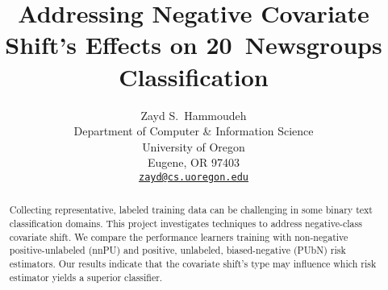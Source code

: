 \documentclass{article}
\title{Addressing Negative Covariate Shift's Effects on 20~Newsgroups Classification}
\author{%
  Zayd S.\ Hammoudeh \\
  Department of Computer \& Information Science \\
  University of Oregon \\
  Eugene, OR 97403 \\
  \texttt{\href{mailto:zayd@cs.uoregon.edu}{zayd@cs.uoregon.edu}}
}
\begin{document}
\maketitle

\begin{abstract}
  Collecting representative, labeled training data can be challenging in some binary text classification domains. This project investigates techniques to address negative-class covariate shift.  We compare the performance learners training with non-negative positive-unlabeled (nnPU) and positive, unlabeled, biased-negative (PUbN) risk estimators. Our results indicate that the covariate shift's type may influence which risk estimator yields a superior classifier.
\end{abstract}


% 
% 




% 



\end{document}
